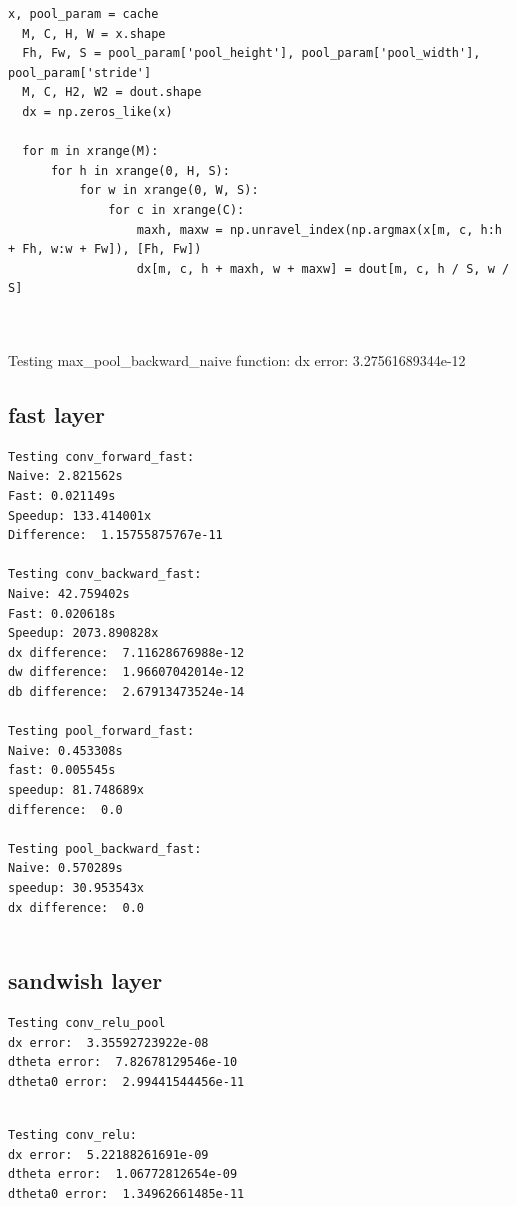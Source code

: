 \documentclass[12pt]{article}
\begin{document}
\begin{lstlisting}
x, pool_param = cache
  M, C, H, W = x.shape
  Fh, Fw, S = pool_param['pool_height'], pool_param['pool_width'], pool_param['stride']
  M, C, H2, W2 = dout.shape
  dx = np.zeros_like(x)

  for m in xrange(M):
      for h in xrange(0, H, S):
          for w in xrange(0, W, S):
              for c in xrange(C):
                  maxh, maxw = np.unravel_index(np.argmax(x[m, c, h:h + Fh, w:w + Fw]), [Fh, Fw])
                  dx[m, c, h + maxh, w + maxw] = dout[m, c, h / S, w / S]
    
  
\end{lstlisting}
Testing max\_pool\_backward\_naive function:
dx error:  3.27561689344e-12







\subsection*{fast layer}
\begin{lstlisting}
Testing conv_forward_fast:
Naive: 2.821562s
Fast: 0.021149s
Speedup: 133.414001x
Difference:  1.15755875767e-11

Testing conv_backward_fast:
Naive: 42.759402s
Fast: 0.020618s
Speedup: 2073.890828x
dx difference:  7.11628676988e-12
dw difference:  1.96607042014e-12
db difference:  2.67913473524e-14

Testing pool_forward_fast:
Naive: 0.453308s
fast: 0.005545s
speedup: 81.748689x
difference:  0.0

Testing pool_backward_fast:
Naive: 0.570289s
speedup: 30.953543x
dx difference:  0.0
  
\end{lstlisting}

\subsection*{sandwish layer}

\begin{lstlisting}
Testing conv_relu_pool
dx error:  3.35592723922e-08
dtheta error:  7.82678129546e-10
dtheta0 error:  2.99441544456e-11
  
\end{lstlisting}


\begin{lstlisting}
Testing conv_relu:
dx error:  5.22188261691e-09
dtheta error:  1.06772812654e-09
dtheta0 error:  1.34962661485e-11
  
\end{lstlisting}
\end{document}
